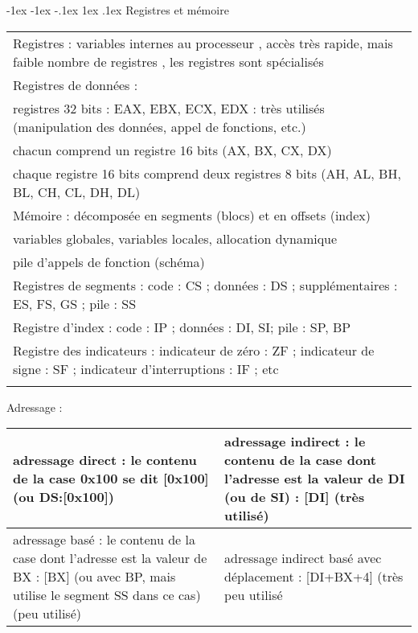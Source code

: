 \documentclass[5pt]{article}
\makeatletter
\renewcommand{\subsection}{\@startsection {section}{1}{\z@}%
             {-1ex \@plus -1ex \@minus -.1ex}%
             {1ex \@plus.1ex}%
             {\normalfont\small\sffamily\bfseries}}
\makeatother
\begin{document}
\begin{scriptsize}
\subsection{Registres et mémoire }
\begin{tabularx}{\linewidth}{|X|}
\hline
Registres : variables internes au processeur , accès très rapide, mais faible nombre de registres , les registres sont spécialisés\\
Registres de données :\\
registres 32 bits : EAX, EBX, ECX, EDX  : très utilisés (manipulation des données, appel de fonctions, etc.)\\ chacun comprend un registre 16 bits (AX, BX, CX, DX)\\ chaque registre 16 bits comprend deux registres 8 bits (AH, AL, BH, BL, CH, CL, DH, DL)
\\\hline
Mémoire : décomposée en segments (blocs) et en offsets (index) \\
variables globales, variables locales, allocation dynamique \\
pile d'appels de fonction (schéma)\\
Registres de segments : code : CS ; données : DS ; supplémentaires : ES, FS, GS ; pile : SS
\\\hline
Registre d'index : code : IP ; données : DI, SI; pile : SP, BP\\
Registre des indicateurs : indicateur de zéro : ZF ; indicateur de signe : SF ; indicateur d'interruptions : IF ; etc\\
\\ \hline
\end{tabularx}
Adressage :\\
\begin{tabularx}{\linewidth}{|Y|Y|}
\hline
adressage direct : le contenu de la case 0x100 se dit [0x100] (ou DS:[0x100]) &
adressage indirect : le contenu de la case dont l'adresse est la valeur de DI (ou de SI) : [DI] (très utilisé)\\\hline
adressage basé : le contenu de la case dont l'adresse est la valeur de BX : [BX] (ou avec BP, mais utilise le segment SS dans ce cas) (peu utilisé)&
adressage indirect basé avec déplacement : [DI+BX+4] (très peu utilisé
\\ \hline
\end{tabularx}

\end{scriptsize}
\end{document}
